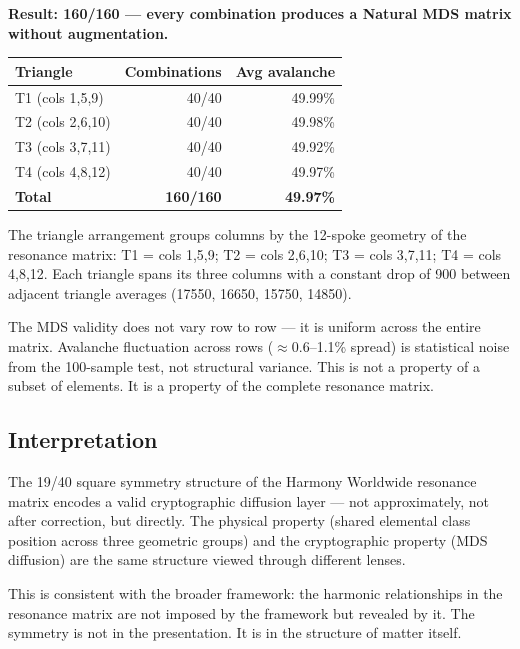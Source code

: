 \documentclass[preprint]{iacrtrans}
\begin{document}
\textbf{Result: 160/160 — every combination produces a Natural MDS matrix
without augmentation.}

\begin{center}
\begin{tabular}{lrr}
\toprule
Triangle & Combinations & Avg avalanche \\
\midrule
T1 (cols 1,5,9)   & 40/40 & 49.99\% \\
T2 (cols 2,6,10)  & 40/40 & 49.98\% \\
T3 (cols 3,7,11)  & 40/40 & 49.92\% \\
T4 (cols 4,8,12)  & 40/40 & 49.97\% \\
\midrule
\textbf{Total}    & \textbf{160/160} & \textbf{49.97\%} \\
\bottomrule
\end{tabular}
\end{center}

The triangle arrangement groups columns by the 12-spoke geometry of the
resonance matrix: T1 = cols 1,5,9; T2 = cols 2,6,10; T3 = cols 3,7,11;
T4 = cols 4,8,12. Each triangle spans its three columns with a constant
drop of 900 between adjacent triangle averages (17550, 16650, 15750, 14850).

The MDS validity does not vary row to row — it is uniform across the entire
matrix. Avalanche fluctuation across rows ($\approx$0.6--1.1\% spread) is
statistical noise from the 100-sample test, not structural variance. This is
not a property of a subset of elements. It is a property of the complete
resonance matrix.

\subsection{Interpretation}

The 19/40 square symmetry structure of the Harmony Worldwide resonance
matrix encodes a valid cryptographic diffusion layer — not approximately,
not after correction, but directly. The physical property (shared elemental
class position across three geometric groups) and the cryptographic property
(MDS diffusion) are the same structure viewed through different lenses.

This is consistent with the broader framework: the harmonic relationships
in the resonance matrix are not imposed by the framework but revealed by it.
The symmetry is not in the presentation. It is in the structure of matter itself.

\end{document}
